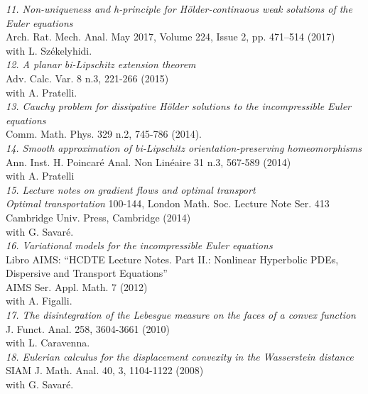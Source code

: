 \documentclass[10pt]{article}
\begin{document}
\textsl{11. Non-uniqueness and h-principle for H\"older-continuous weak solutions of the Euler equations}\\
Arch. Rat. Mech. Anal. May 2017, Volume 224, Issue 2, pp. 471--514 (2017)\\
with L. Sz\'ekelyhidi.\\


\textsl{12. A planar bi-Lipschitz extension theorem}\\
Adv. Calc. Var. 8 n.3, 221-266 (2015)\\
with A. Pratelli.\\

\textsl{13. Cauchy problem for dissipative H\"older solutions to the incompressible Euler equations}\\
Comm. Math. Phys. 329 n.2, 745-786 (2014).\\




\textsl{14. Smooth approximation of bi-Lipschitz orientation-preserving homeomorphisms}\\
Ann. Inst. H. Poincar\'e Anal. Non Lin\'eaire 31 n.3, 567-589 (2014)\\
with A. Pratelli\\


\textsl{15. Lecture notes on gradient flows and optimal transport}\\
\emph{Optimal transportation} 100-144,
London Math. Soc. Lecture Note Ser. 413 \\
Cambridge Univ. Press, Cambridge (2014)\\
with G. Savar\'e.\\

\textsl{16. Variational models for the incompressible Euler equations}\\
Libro AIMS: ``HCDTE Lecture Notes. Part II.: Nonlinear Hyperbolic PDEs, Dispersive and Transport Equations''\\
AIMS Ser. Appl. Math. 7 (2012)\\
with A. Figalli.\\



\textsl{17. The disintegration of the Lebesgue measure on the faces of a convex function}\\
J. Funct. Anal. 258, 3604-3661 (2010)\\
with L. Caravenna.\\

\textsl{18. Eulerian calculus for the displacement convexity in the Wasserstein distance}\\
SIAM J. Math. Anal. 40, 3, 1104-1122 (2008)\\
with G. Savar\'e.\\ 
\end{document}

